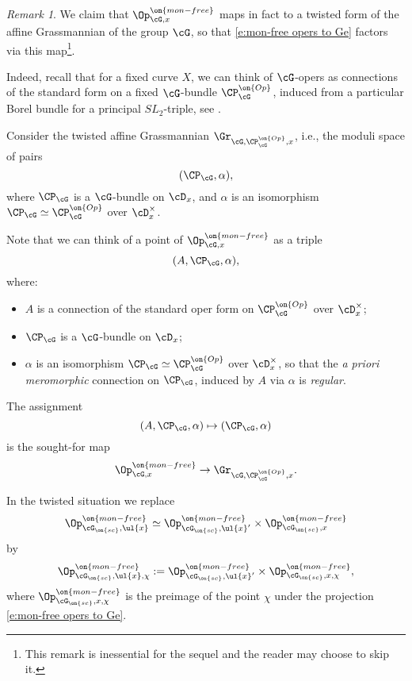 \documentclass[9pt]{amsart}
\theoremstyle{remark}
\newtheorem{rem}[subsubsection]{Remark}
\theoremstyle{definition}
\theoremstyle{remark}
\numberwithin{equation}{section}
\begin{document}
\begin{rem}

We claim that $\Op^{\on{mon-free}}_{\cG,x}$ maps in fact to a twisted form of the affine Grassmannian
of the group $\cG$, so that \eqref{e:mon-free opers to Ge} factors via this map\footnote{This remark is inessential for the sequel
and the reader may choose to skip it.}.

\medskip 

Indeed, recall that for a fixed curve $X$, we can think of $\cG$-opers as connections of the standard form on a fixed
$\cG$-bundle $\CP^{\on{Op}}_\cG$, induced from a particular Borel bundle for a principal $SL_2$-triple, see \cite[Sect. 3.1.4]{GLC2}. 

\medskip

Consider the twisted affine Grassmannian $\Gr_{\cG,\CP^{\on{Op}}_\cG,x}$, 
i.e., the moduli space of pairs
$$(\CP_\cG,\alpha),$$
where $\CP_\cG$ is a $\cG$-bundle on $\cD_x$, and $\alpha$ is an isomorphism $\CP_\cG\simeq \CP^{\on{Op}}_\cG$
over $\cD^\times_x$. 

\medskip

Note that we can think of a point of $\Op^{\on{mon-free}}_{\cG,x}$ as a triple
$$(A,\CP_\cG,\alpha),$$
where:

\begin{itemize}

\item  $A$ is a connection of the standard oper form on $\CP^{\on{Op}}_\cG$ over $\cD^\times_x$;

\item $\CP_\cG$ is a $\cG$-bundle on $\cD_x$;

\item $\alpha$ is an isomorphism $\CP_\cG\simeq \CP^{\on{Op}}_\cG$ over $\cD^\times_x$, so that
the \emph{a priori meromorphic} connection on $\CP_\cG$, induced by $A$ via $\alpha$ is \emph{regular}.

\end{itemize}

The assignment 
$$(A,\CP_\cG,\alpha)\mapsto (\CP_\cG,\alpha)$$
is the sought-for map
$$\Op^{\on{mon-free}}_{\cG,x}\to \Gr_{\cG,\CP^{\on{Op}}_\cG,x}.$$

\end{rem} 



\sssec{}

In the twisted situation we replace
$$\Op^{\on{mon-free}}_{\cG_{\on{sc}},\ul{x}}\simeq \Op^{\on{mon-free}}_{\cG_{\on{sc}},\ul{x}'}\times 
\Op^{\on{mon-free}}_{\cG_{\on{sc}},x}$$
by
$$\Op^{\on{mon-free}}_{\cG_{\on{sc}},\ul{x},\chi}:=
\Op^{\on{mon-free}}_{\cG_{\on{sc}},\ul{x}'}\times \Op^{\on{mon-free}}_{\cG_{\on{sc}},x,\chi},$$
where $\Op^{\on{mon-free}}_{\cG_{\on{sc}},x,\chi}$ is the preimage of the point $\chi$ under the projection \eqref{e:mon-free opers to Ge}. 
\end{document}
